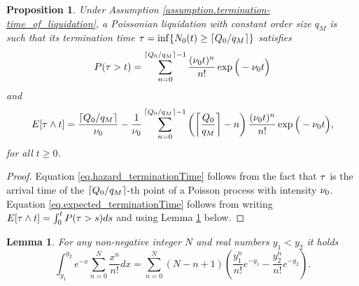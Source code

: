 \documentclass[10pt, article,table]{article}
\newtheorem{prop}[thm]{Proposition}
\newtheorem{lemma}[thm]{Lemma}
\begin{document}
\begin{prop}\label{prop.terminationTime_poisson_and_constant-size}
 Under Assumption \ref{assumption.termination-time_of_liquidation}, a Poissonian liquidation with constant order size $q_{M}$ is such that its termination time $\terminationTime=\inf\lbrace \countingProc[0](t)\geq \lceil \metaorderSize / q_{M}\rceil \rbrace$ satisfies 
 \begin{equation}\label{eq.hazard_terminationTime}
  \Prob(\terminationTime >t ) 
  =
  \sum_{n=0}^{\lceil \metaorderSize / q_{M} \rceil -1 }
  \frac{(\baseRate_0 t)^{n}}{n!}\exp \Big(-\baseRate_{0} t \Big)
 \end{equation}
and 
\begin{equation}\label{eq.expected_terminationTime}
 \Expectation [\terminationTime \wedge t ]
 =
 \frac{\lceil \metaorderSize / q_{M} \rceil}{\baseRate_0}
 - \frac{1}{\baseRate_{0}}
  \sum_{n=0}^{\lceil \metaorderSize / q_{M} \rceil -1 }
  \left( \left\lceil \frac{\metaorderSize}{q_{M}}\right\rceil - n \right) 
  \frac{(\baseRate_0 t)^{n}}{n!}\exp \Big(-\baseRate_{0} t \Big),
\end{equation}
for all $t\geq 0$.
\end{prop}
\begin{proof}
 Equation \eqref{eq.hazard_terminationTime} follows from the fact that $\terminationTime$ is the arrival time of the $\lceil \metaorderSize/q_{M} \rceil$-th point of a Poisson process with  intensity $\baseRate_{0}$. Equation \eqref{eq.expected_terminationTime} follows from writing $
  \Expectation[\terminationTime \wedge t ] = 
  \intzerot \Prob(\terminationTime > s ) ds
 $
 and using Lemma \ref{lemma.expected_terminationTime} below.
\end{proof}
\begin{lemma}\label{lemma.expected_terminationTime}
 For any non-negative integer $N$ and real numbers $y_1<y_2$ it holds
 \begin{equation*}
  \int_{y_1}^{y_2}
  e^{-x}\sum_{n=0}^{N} \frac{x^{n}}{n!}dx
  =
  \sum_{n=0}^{N}
  (N-n+1)
  \left(
  \frac{y_{1}^{n}}{n!} e^{-y_1} -  \frac{y_{2}^{n}}{n!} e^{-y_2} 
  \right).
 \end{equation*}
\end{lemma}
\end{document}
